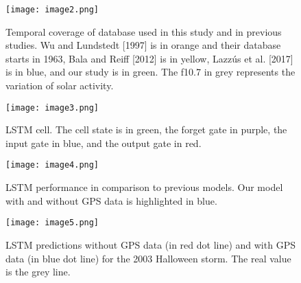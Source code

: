 \begin{figure}
	\texttt{[image: image2.png]}
	\caption{Temporal coverage of database used in this study and in previous studies. Wu and Lundstedt [1997] is in orange and their database starts in 1963, Bala and Reiff [2012] is in yellow, Lazzús et al. [2017] is in blue, and our study is in green. The f10.7 in grey represents the variation of solar activity.}
	\label{fig:datacoverage}
\end{figure}





\begin{figure}
	\noindent\texttt{[image: image3.png]}
	\caption{LSTM cell. The cell state is in green, the forget gate in purple, the input gate in blue, and the output gate in red.}
	\label{fig:lstmcell}
\end{figure}






\begin{figure}
	\texttt{[image: image4.png]}
	\caption{LSTM performance in comparison to previous models. Our model with and without GPS data is highlighted in blue.}
	\label{fig:lstmperf}
\end{figure}






\begin{figure}
	\texttt{[image: image5.png]}
	\caption{LSTM predictions without GPS data (in red dot line) and with GPS data (in blue dot line) for the 2003 Halloween storm. The real value is the grey line.}
	\label{fig:lstmpredswoGPS}
\end{figure}






